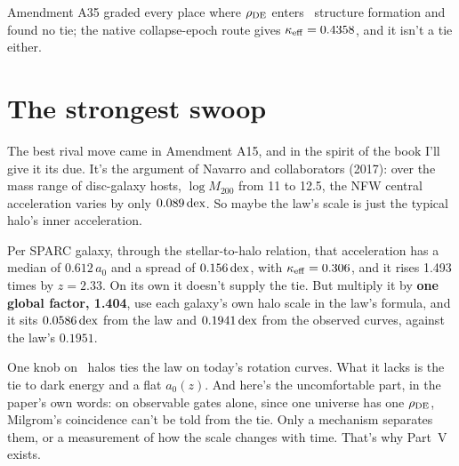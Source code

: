 




Amendment A35 graded every place where $\rho_{\rm DE}$ enters \LCDM\ structure formation and found no tie; the native collapse-epoch route gives $\kappa_{\rm eff}=0.4358$, and it isn't a tie either.

\section{The strongest swoop}

The best rival move came in Amendment A15, and in the spirit of the book I'll give it its due. It's the argument of Navarro and collaborators (2017): over the mass range of disc-galaxy hosts, $\log M_{200}$ from 11 to 12.5, the NFW central acceleration varies by only $0.089\,\mathrm{dex}$. So maybe the law's scale is just the typical halo's inner acceleration.

Per SPARC galaxy, through the stellar-to-halo relation, that acceleration has a median of $0.612\,a_0$ and a spread of $0.156\,\mathrm{dex}$, with $\kappa_{\rm eff}=0.306$, and it rises 1.493 times by $z=2.33$. On its own it doesn't supply the tie. But multiply it by \textbf{one global factor, 1.404}, use each galaxy's own halo scale in the law's formula, and it sits $0.0586\,\mathrm{dex}$ from the law and $0.1941\,\mathrm{dex}$ from the observed curves, against the law's $0.1951$.

\begin{honestbox}
One knob on \LCDM\ halos ties the law on today's rotation curves. What it lacks is the tie to dark energy and a flat $a_0(z)$. And here's the uncomfortable part, in the paper's own words: on observable gates alone, since one universe has one $\rho_{\rm DE}$, Milgrom's coincidence can't be told from the tie. Only a mechanism separates them, or a measurement of how the scale changes with time. That's why Part~V exists.
\end{honestbox}

